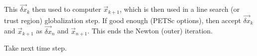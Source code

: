 This $\Vec{\delta x}_k$ then used to computer $\Vec{x}_{k+1}$, which is then used in a line search (or trust region) globalization step.
If good enough (PETSc options), then accept $\Vec{\delta x}_k$ and $\Vec{x}_{k+1}$ as $\Vec{\delta x}_n$ and $\Vec{x}_{n+1}$.
This ends the Newton (outer) iteration.

Take next time step.





